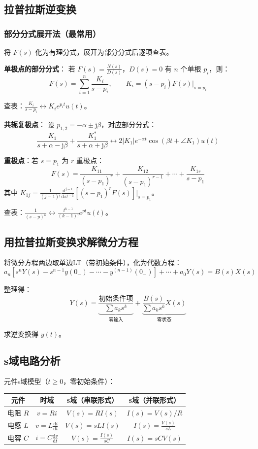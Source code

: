 \documentclass[11pt,a4paper]{ctexart}
\newcommand{\jj}{\mathrm{j}}            %
\newcommand{\dd}{\mathrm{d}}            %
\begin{document}
\subsection{拉普拉斯逆变换}

\subsubsection{部分分式展开法（最常用）}

将 $F(s)$ 化为有理分式，展开为部分分式后逐项查表。

\textbf{单极点的部分分式}：
若 $F(s) = \frac{N(s)}{D(s)}$，$D(s) = 0$ 有 $n$ 个单根 $p_i$，则：
\[
F(s) = \sum_{i=1}^{n} \frac{K_i}{s - p_i},\qquad
K_i = (s - p_i)F(s)\big|_{s = p_i}
\]

查表：$\frac{K_i}{s - p_i} \leftrightarrow K_i e^{p_i t}u(t)$。

\textbf{共轭复极点}：
设 $p_{1,2} = -\alpha \pm \jj\beta$，对应部分分式：
\[
\frac{K_1}{s + \alpha - \jj\beta} + \frac{K_1^*}{s + \alpha + \jj\beta} \leftrightarrow 2|K_1|e^{-\alpha t}\cos(\beta t + \angle K_1)u(t)
\]

\textbf{重极点}：若 $s = p_1$ 为 $r$ 重极点：
\[
F(s) = \frac{K_{11}}{(s-p_1)^r} + \frac{K_{12}}{(s-p_1)^{r-1}} + \cdots + \frac{K_{1r}}{s-p_1}
\]
其中 $K_{1j} = \frac{1}{(j-1)!}\frac{\dd^{j-1}}{\dd s^{j-1}}[(s-p_1)^r F(s)]\big|_{s=p_1}$。

查表：$\frac{1}{(s-p)^k} \leftrightarrow \frac{t^{k-1}}{(k-1)!}e^{pt}u(t)$。

\subsection{用拉普拉斯变换求解微分方程}

将微分方程两边取单边LT（带初始条件），化为代数方程：
\[
a_n[s^n Y(s) - s^{n-1}y(0_-) - \cdots - y^{(n-1)}(0_-)] + \cdots + a_0Y(s) = B(s)X(s)
\]

整理得：
\[
Y(s) = \underbrace{\frac{\text{初始条件项}}{\sum a_k s^k}}_{\text{零输入}} + \underbrace{\frac{B(s)}{\sum a_k s^k}X(s)}_{\text{零状态}}
\]

求逆变换得 $y(t)$。

\subsection{s域电路分析}

元件s域模型（$t \ge 0$，零初始条件）：

\begin{tabular}{c|c|c|c}
\toprule
元件 & 时域 & s域（串联形式）& s域（并联形式）\\
\midrule
电阻 $R$ & $v = Ri$ & $V(s) = RI(s)$ & $I(s) = V(s)/R$ \\
电感 $L$ & $v = L\frac{\dd i}{\dd t}$ & $V(s) = sL I(s)$ & $I(s) = \frac{V(s)}{sL}$ \\
电容 $C$ & $i = C\frac{\dd v}{\dd t}$ & $V(s) = \frac{I(s)}{sC}$ & $I(s) = sC V(s)$ \\
\bottomrule
\end{tabular}
\end{document}
